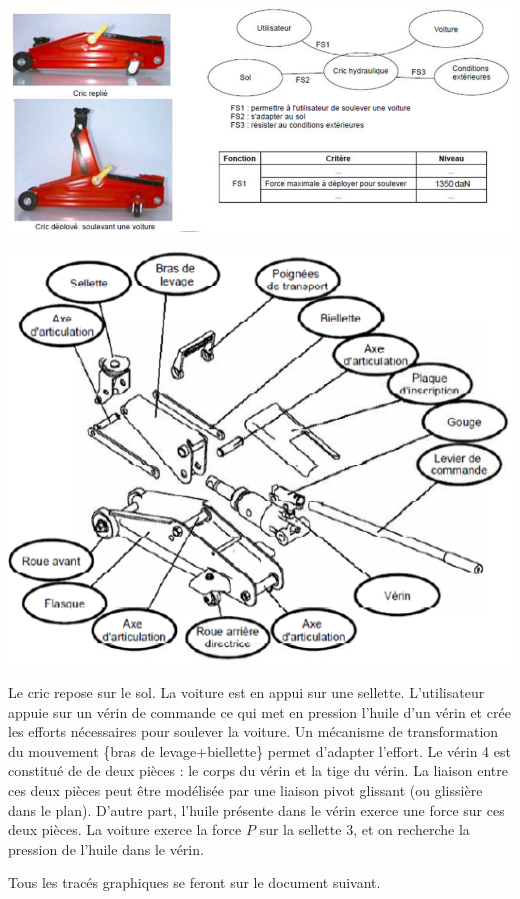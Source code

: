 \documentclass[11pt,oneside]{article}
\begin{document}
\begin{center}
\includegraphics[width=.9\textwidth]{png/img7.png}
\end{center}


\begin{center}
\includegraphics[width=.9\textwidth]{png/img8.png}
\end{center}

Le cric repose sur le sol. La voiture est en appui sur une sellette. L'utilisateur appuie sur un vérin de commande ce qui met en pression l'huile d'un vérin et crée les efforts nécessaires pour soulever la voiture. Un mécanisme de transformation du mouvement \{bras de levage+biellette\} permet d'adapter l'effort. Le vérin 4 est constitué de de deux pièces : le corps du vérin et la tige du vérin. La liaison entre ces deux pièces peut être modélisée par une liaison pivot glissant (ou glissière dans le plan). D'autre part, l'huile présente dans le vérin exerce une force sur ces deux pièces. La voiture exerce la force $P$ sur la sellette 3, et on recherche la pression de l'huile dans le vérin. 

Tous les tracés graphiques se feront sur le document suivant.
\end{document}
